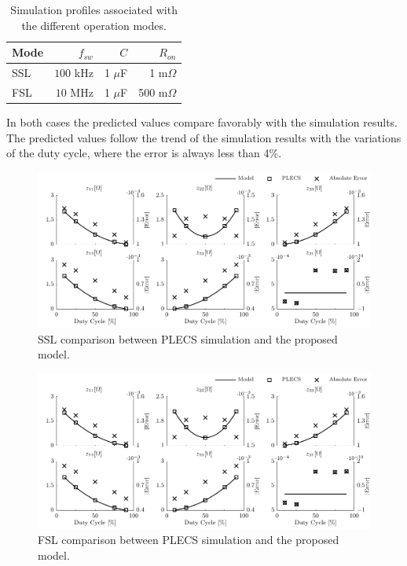 \begin{table}[!h]
    \renewcommand{\arraystretch}{1.3}
    \centering
    \caption{Simulation profiles associated with the different operation modes. }
    \label{tab:sim_modes}
    \begin{tabular}{ l || r  r  r  }
       Mode      & $f_{sw}$  & $C$ & $R_{on}$   \\
      \hline \hline
      SSL   &  $100$ kHz   & 1 $\mu$F  & 1 m$\Omega$  \\
      FSL   &  $10$ MHz   &  1 $\mu$F  & 500 m$\Omega$

    \end{tabular}
\end{table}

In both cases the predicted values compare favorably with the simulation results. The predicted values follow the trend of the simulation results with the variations of the duty cycle, where the error is always less than 4\%.

\begin{figure}[!h]
  \includegraphics[page=1,width=12cm]{./4_model_validation/APEC_SIM_big}
  \centering
  \caption{SSL comparison between PLECS simulation and the proposed model.}
  \label{fig:sim_ssl}
\end{figure}


\begin{figure}[!h]
  \includegraphics[page=3,width=12cm]{./4_model_validation/APEC_SIM_big}
  \centering
  \caption{FSL comparison between PLECS simulation and the proposed model.}
  \label{fig:sim_fsl}
\end{figure}


